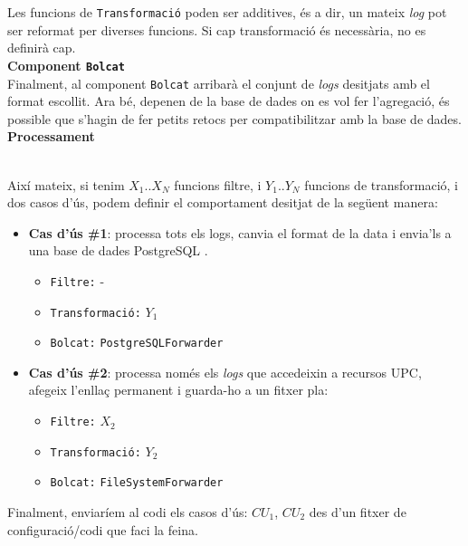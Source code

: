 \noindent
Les funcions de \texttt{Transformació} poden ser additives, és a dir, un mateix \textit{\gls{log}} pot ser reformat per diverses funcions.
Si cap transformació és necessària, no es definirà cap. \\

\noindent
\textbf{Component \texttt{Bolcat}} \\

\noindent
Finalment, al component \texttt{Bolcat} arribarà el conjunt de \textit{\gls{log}s} desitjats amb el format escollit.
Ara bé, depenen de la base de dades on es vol fer l’agregació, és possible que s’hagin de fer petits retocs per compatibilitzar amb la base de dades. \\

\noindent
\textbf{Processament}

\noindent \\
Així mateix, si tenim \(X_1\)..\(X_N\) funcions filtre, i \(Y_1\)..\(Y_N\) funcions de transformació, i dos casos d’ús, podem definir el comportament desitjat de la següent manera:

\begin{itemize}
    \item \textbf{Cas d'ús \#1}: processa tots els logs, canvia el format de la data i envia'ls a una base de dades PostgreSQL .
    \begin{itemize}
        \item \texttt{Filtre:} -
        \item \texttt{Transformació:} \(Y_1\)
        \item \texttt{Bolcat:} \texttt{PostgreSQLForwarder}
    \end{itemize}
    \item \textbf{Cas d'ús \#2}: processa només els \textit{\gls{log}s} que accedeixin a recursos UPC, afegeix l’enllaç permanent i guarda-ho a un fitxer pla:
    \begin{itemize}
        \item \texttt{Filtre:} \(X_2\)
        \item \texttt{Transformació:} \(Y_2\)
        \item \texttt{Bolcat:} \texttt{FileSystemForwarder}
    \end{itemize}
\end{itemize}

\noindent
Finalment, enviaríem al codi els casos d’ús: \(CU_1\), \(CU_2\) des d'un fitxer de configuració/codi que faci la feina.

\clearpage

